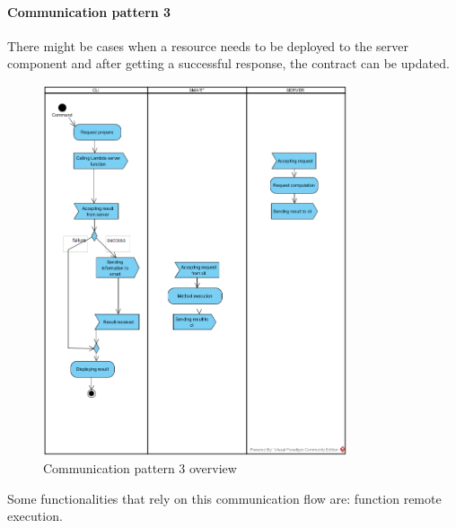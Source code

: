 \paragraph{Communication pattern 3}
There might be cases when a resource needs to be deployed to the server component and after getting a successful response, the contract can be updated.
\begin{figure}[H]
	\centering
	\includegraphics[width=0.8\textwidth]{res/img/pattern3.jpg}
	\caption{Communication pattern 3 overview}
\end{figure}
\noindent Some functionalities that rely on this communication flow are: function remote execution.
